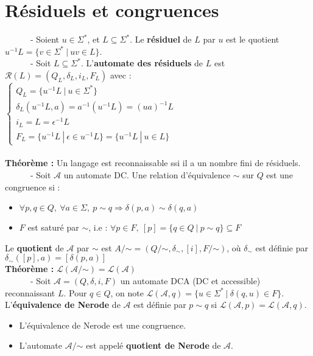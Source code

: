 \documentclass[11pt,a4paper]{article}
\begin{document}
\section{Résiduels et congruences}

\ \ \ \ \ \ - Soient $u \in \Sigma^*$, et $L \subseteq \Sigma^*$. Le \textbf{résiduel} de $L$ par $u$ est le quotient $u^{-1}L=\{v \in \Sigma^* \ | \ uv \in L \}$. \\

\ \ \ \ \ \ - Soit $L \subseteq \Sigma^*$. L'\textbf{automate des résiduels} de $L$ est $\mathcal{R}(L) = (Q_L, \delta_L, i_L, F_L)$ avec : \\
 $\begin{cases} Q_L = \{u^{-1}L \ | \ u \in \Sigma^* \} \\ \delta_L(u^{-1}L,a)=a^{-1}(u^{-1}L)=(ua)^{-1}L \\ i_L = L = \epsilon^{-1}L \\ F_L = \{u^{-1}L \ | \ \epsilon \in u^{-1}L \} = \{u^{-1}L \ | \ u \in L \} \end{cases}$ \\ \\

\textbf{Théorème :} Un langage est reconnaissable ssi il a un nombre fini de résiduels. \\ 

\ \ \ \ \ \ - Soit $\mathcal{A}$ un automate DC. Une relation d'équivalence $\sim$ sur $Q$ est une congruence si :
\begin{itemize}
\item $\forall p,q \in Q, \ \forall a \in \Sigma, \ p \sim q \Rightarrow \delta(p,a) \sim \delta(q,a)$
\item $F$ est saturé par $\sim$, i.e : $\forall p \in F, \ [p]=\{q \in Q \ | \ p \sim q \} \subseteq F$
\end{itemize}
Le \textbf{quotient} de $\mathcal{A}$ par $\sim$ est $A/\mathord\sim = (Q/\mathord\sim,\delta_{\sim},[i],F/\mathord\sim)$, où $\delta_{\sim}$ est définie par $\delta_{\sim}([p],a)=[\delta	(p,a)]$ \\

\textbf{Théorème :} $\mathcal{L}(\mathcal{A}/\mathord\sim) = \mathcal{L}(\mathcal{A})$ \\

\ \ \ \ \ \ - Soit $\mathcal{A}=(Q,\delta,i,F)$ un automate DCA (DC et accessible) reconnaissant $L$. Pour $q \in Q$, on note $\mathcal{L}(\mathcal{A},q)=\{u \in \Sigma^* \ | \ \delta(q,u) \in F \}$. L'\textbf{équivalence de Nerode} de $\mathcal{A}$ est définie par $p \sim q$ si $\mathcal{L}(\mathcal{A},p)=\mathcal{L}(\mathcal{A},q)$.
\begin{itemize}
\item L'équivalence de Nerode est une congruence. 
\item L'automate $\mathcal{A}/\mathord\sim$ est appelé \textbf{quotient de Nerode} de $\mathcal{A}$. \\
\end{itemize}
\end{document}
